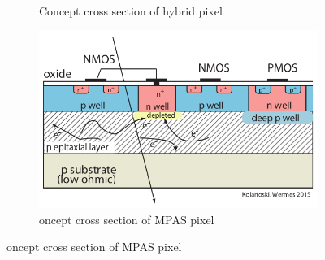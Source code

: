 \begin{titlepage}
\begin{figure}
\begin{subfigure}{.5\textwidth}
     \caption{Concept cross section of hybrid pixel}
     \label{fig:radiation_damage_scheme}
   \end{subfigure}%
   \begin{subfigure}{.5\textwidth}
     \centering
     \includegraphics[width=.8\linewidth]{figures/MAPS_scheme.png}
     \caption{oncept cross section of MPAS pixel}
     \label{fig:MAPS_scheme}
   \end{subfigure}
\end{figure}



\end{titlepage}

